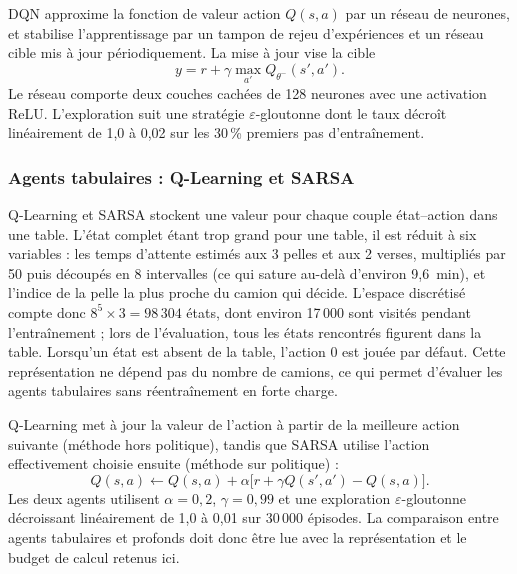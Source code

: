 \documentclass[11pt,a4paper]{article}
\newif\ifrevmarks
\newcommand{\revtag}[1]{\ifrevmarks\textsuperscript{\textcolor{red!70!black}{\scriptsize[#1]}}\fi}
\newcommand{\rev}[2]{\ifrevmarks{\color{revcolor}#2}\revtag{#1}\else#2\fi}
\newenvironment{revbloc}[1]{\par\ifrevmarks\color{revcolor}\noindent\revtag{#1}\ \fi}{\par}
\begin{document}
\rev{Bibliographie, M14}{DQN \cite{Mnih2015} approxime la fonction de valeur action $Q(s,a)$ par un réseau de neurones, et stabilise l'apprentissage par un tampon de rejeu d'expériences et un réseau cible mis à jour périodiquement. La mise à jour vise la cible}
\begin{equation}
y = r + \gamma \max_{a'} Q_{\theta^-}(s', a') .
\end{equation}
Le réseau comporte deux couches cachées de 128 neurones avec une activation ReLU. L'exploration suit une stratégie $\varepsilon$-gloutonne dont le taux décroît linéairement de 1,0 à 0,02 sur les 30\,\% premiers pas d'entraînement.

\subsubsection{Agents tabulaires : Q-Learning et SARSA}

\begin{revbloc}{M8}
Q-Learning \cite{WatkinsDayan1992} et SARSA \cite{RummeryNiranjan1994} stockent une valeur pour chaque couple état--action dans une table. L'état complet étant trop grand pour une table, il est réduit à six variables : les temps d'attente estimés aux 3 pelles et aux 2 verses, multipliés par 50 puis découpés en 8 intervalles (ce qui sature au-delà d'environ 9,6~min), et l'indice de la pelle la plus proche du camion qui décide. L'espace discrétisé compte donc $8^5 \times 3 = 98\,304$ états, dont environ 17\,000 sont visités pendant l'entraînement ; lors de l'évaluation, tous les états rencontrés figurent dans la table. Lorsqu'un état est absent de la table, l'action 0 est jouée par défaut. Cette représentation ne dépend pas du nombre de camions, ce qui permet d'évaluer les agents tabulaires sans réentraînement en forte charge.

Q-Learning met à jour la valeur de l'action à partir de la meilleure action suivante (méthode hors politique), tandis que SARSA utilise l'action effectivement choisie ensuite (méthode sur politique) :
\begin{equation}
Q(s,a) \leftarrow Q(s,a) + \alpha \big[ r + \gamma Q(s',a') - Q(s,a) \big] .
\end{equation}
Les deux agents utilisent $\alpha = 0{,}2$, $\gamma = 0{,}99$ et une exploration $\varepsilon$-gloutonne décroissant linéairement de 1,0 à 0,01 sur 30\,000 épisodes. La comparaison entre agents tabulaires et profonds doit donc être lue avec la représentation et le budget de calcul retenus ici.
\end{revbloc}
\end{document}
